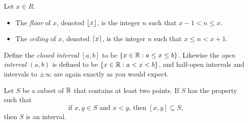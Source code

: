 \documentclass[11pt,twoside=off,numbers=noenddot]{scrbook}
\begin{document}
\begin{definition}
  Let $x \in R$.
  \begin{itemize}
    \item The \textit{floor} of $x$, denoted $\lfloor x \rfloor$, is the
      integer $n$ such that $x  - 1 < n \leq x$.
    \item The \textit{ceiling} of $x$, denoted $\lceil x \rceil$, is the
      integer $n$ such that $x \leq n < x + 1$.
  \end{itemize}
\end{definition}

\begin{definition}
  Define the \textit{closed interval} $[a, b]$ to be $\{ x \in \mathbb R
  : a \leq x \leq b \}$. Likewise the \textit{open interval} $(a, b)$
  is defined to be $\{ x \in \mathbb R : a < x < b \}$, and half-open
  intervals and intervals to $\pm\infty$ are again exactly as you would expect.
\end{definition}

\begin{theorem}
  Let $S$ be a subset of $\mathbb R$ that contains at least two points. If
  $S$ has the property such that
  \[ \text{if $x, y \in S$ and $x < y$, then $[x, y] \subseteq S$}, \tag{1} \]
  then $S$ is an interval.
\end{theorem}
\end{document}
